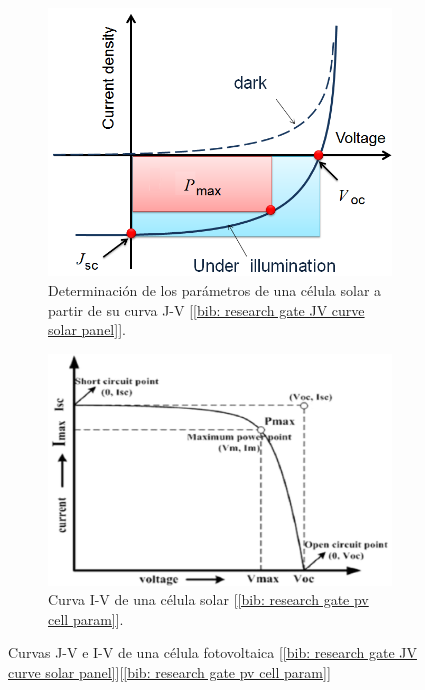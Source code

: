 \documentclass[12pt]{article}
\begin{document}
		\begin{figure}[h]
		\begin{subfigure}{0.5\textwidth}
			\includegraphics[width=1\textwidth]{img/JV_curve_solarCell.png} 
			\caption{Determinación de los parámetros de una célula solar a partir de su curva J-V [\ref{bib: research gate JV curve solar panel}].}
			\label{fig: curva J-V célula solar}
		\end{subfigure}
		\begin{subfigure}{0.5\textwidth}
			\includegraphics[width=1\linewidth]{img/IV_curve_solarCell.png}
			\caption{Curva I-V de una célula solar [\ref{bib: research gate pv cell param}].}
			\label{fig: I-V curve of a solar cell}
		\end{subfigure}
		\caption{Curvas J-V e I-V de una célula fotovoltaica [\ref{bib: research gate JV curve solar panel}][\ref{bib: research gate pv cell param}]}
		\label{fig:curvas J-V e I-V célula PV}
	\end{figure}
\end{document}
